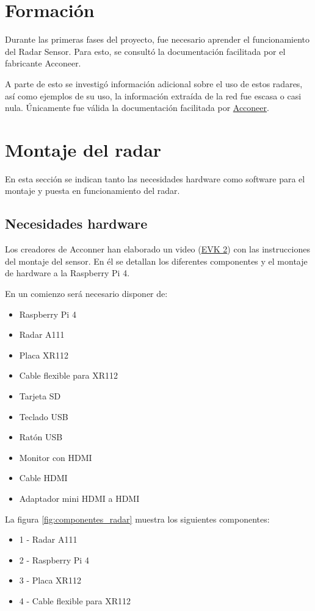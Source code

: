 \section{Formación}
Durante las primeras fases del proyecto, fue necesario aprender el funcionamiento del Radar Sensor. Para esto, se consultó la documentación facilitada por el fabricante Acconeer.

A parte de esto se investigó información adicional sobre el uso de estos radares, así como ejemplos de su uso, la información extraída de la red fue escasa o casi nula. Únicamente fue válida la documentación facilitada por \href{https://acconeer-python-exploration.readthedocs.io/}{Acconeer}.

\section{Montaje del radar}

En esta sección se indican tanto las necesidades hardware como software para el montaje y puesta en funcionamiento del radar.

\subsection{Necesidades hardware}
Los creadores de Acconner han elaborado un video (\href{https://www.youtube.com/watch?v=0uKrm_RAV_c}{EVK 2}) con las instrucciones del montaje del sensor. En él se detallan los diferentes componentes y el montaje de hardware a la Raspberry Pi 4.

En un comienzo será necesario disponer de: 
\begin{itemize}
	\item Raspberry Pi 4
	\item Radar A111
	\item Placa XR112
	\item Cable flexible para XR112
	\item Tarjeta SD
	\item Teclado USB
	\item Ratón USB
	\item Monitor con HDMI
	\item Cable HDMI
	\item Adaptador mini HDMI a HDMI
\end{itemize}


La figura \ref{fig:componentes_radar} muestra los siguientes componentes:
\begin{itemize}
	\item[]1 - Radar A111
	\item[]2 - Raspberry Pi 4
	\item[]3 - Placa XR112
	\item[]4 - Cable flexible para XR112
\end{itemize}


